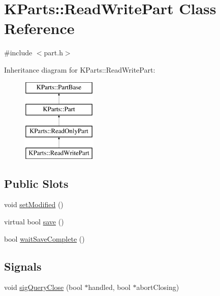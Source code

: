 \hypertarget{classKParts_1_1ReadWritePart}{\section{\-K\-Parts\-:\-:\-Read\-Write\-Part \-Class \-Reference}
\label{classKParts_1_1ReadWritePart}
}


{\ttfamily \#include $<$part.\-h$>$}

\-Inheritance diagram for \-K\-Parts\-:\-:\-Read\-Write\-Part\-:\begin{figure}[H]
\begin{center}
\leavevmode
\includegraphics[height=4.000000cm]{classKParts_1_1ReadWritePart}
\end{center}
\end{figure}
\subsection*{\-Public \-Slots}
\begin{DoxyCompactItemize}
\item 
void \hyperlink{classKParts_1_1ReadWritePart_a3d3c236bfa46585c595eb8fca1f8b50a}{set\-Modified} ()
\item 
virtual bool \hyperlink{classKParts_1_1ReadWritePart_afcd2d898594f129e47ac4505c2ae5cd0}{save} ()
\item 
bool \hyperlink{classKParts_1_1ReadWritePart_a3c27f7fb8ee9636e2c9d6b5cd6328e49}{wait\-Save\-Complete} ()
\end{DoxyCompactItemize}
\subsection*{\-Signals}
\begin{DoxyCompactItemize}
\item 
void \hyperlink{classKParts_1_1ReadWritePart_adb7caee3c74e13b22dd922f67a68f830}{sig\-Query\-Close} (bool $\ast$handled, bool $\ast$abort\-Closing)
\end{DoxyCompactItemize}
